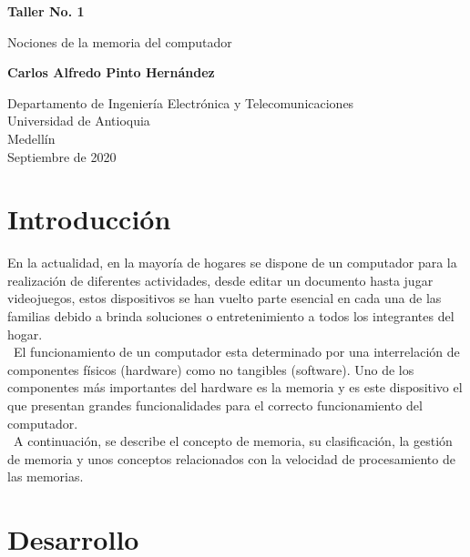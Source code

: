 \documentclass{article}
\begin{document}
\begin{titlepage}
    \begin{center}
        \vspace*{1cm}
            
        \Huge
        \textbf{Taller No. 1}
            
        \vspace{0.5cm}
        \LARGE
        Nociones de la memoria del computador
            
        \vspace{1.5cm}
            
        \textbf{Carlos Alfredo Pinto Hernández}
            
        \vfill
        
        \vspace{0.8cm}
            
        \Large
        Departamento de Ingeniería Electrónica y Telecomunicaciones\\
        Universidad de Antioquia\\
        Medellín\\
        Septiembre de 2020
            
    \end{center}
\end{titlepage}

\tableofcontents

\section{Introducción}
En la actualidad, en la mayoría de hogares se dispone de un computador para la realización de diferentes actividades, desde editar un documento hasta jugar videojuegos, estos dispositivos se han vuelto parte esencial en cada una de las familias debido a brinda soluciones o entretenimiento a todos los integrantes del hogar.\\\
El funcionamiento de un computador esta determinado por una interrelación de componentes físicos (hardware) como no tangibles (software). Uno de los componentes más importantes del hardware es la memoria y es este dispositivo el que presentan grandes funcionalidades para el correcto funcionamiento del computador.\\\
A continuación, se describe el concepto de memoria, su clasificación, la gestión de memoria y unos conceptos relacionados con la velocidad de procesamiento de las memorias.


\section{Desarrollo} \label{contenido}
\end{document}
